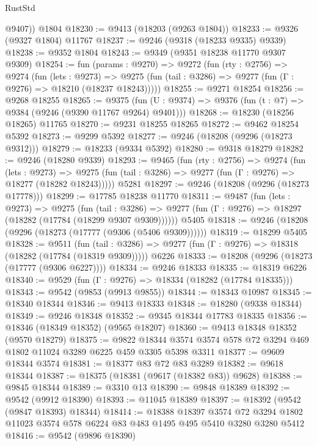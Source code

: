 \begin{lexlean}{RustStd}
\begin{coremodule}
{\begin{coremodule}
{{{{{{{{{{{{{{{{{{{{{{{{{{{{{{{{{        @9407))
    @1804
@18230 := @9413 (@18203 (@9263 @1804))
@18233 := @9326 (@9327 @1804) @11767
@18237 := @9246 (@9318 (@18233 @9335) @9339)
@18238 := @9352 @1804
@18243 := @9349 (@9351 @18238 @11770 @9307 @9309)
@18254 := fun (params : @9270) =>
  @9272
    (fun (rty : @2756) =>
    @9274
      (fun (lets : @9273) =>
      @9275 (fun (tail : @3286) => @9277 (fun (Γ : @9276) => @18210 (@18237 @18243)))))
@18255 := @9271 @18254
@18256 := @9268 @18255
@18265 := @9375
    (fun (U : @9374) => @9376 (fun (t : @7) => @9384 (@9246 (@9390 @11767 @9264) @9401)))
@18268 := @18230 (@18256 @18265) @11765
@18270 := @9231 @18255 @18265
@18272 := @9462 @18254 @5392
@18273 := @9299 @5392
@18277 := @9246 (@18208 (@9296 (@18273 @9312)))
@18279 := @18233 (@9334 @5392)
@18280 := @9318 @18279
@18282 := @9246 (@18280 @9339)
@18293 := @9465
    (fun (rty : @2756) =>
    @9274
      (fun (lets : @9273) =>
      @9275 (fun (tail : @3286) => @9277 (fun (Γ : @9276) => @18277 (@18282 @18243)))))
    @5281
@18297 := @9246 (@18208 (@9296 (@18273 @17778)))
@18299 := @17785 @18238 @11770
@18311 := @9487
    (fun (lets : @9273) =>
    @9275
      (fun (tail : @3286) =>
      @9277 (fun (Γ : @9276) => @18297 (@18282 (@17784 (@18299 @9307 @9309))))))
    @5405
@18318 := @9246 (@18208 (@9296 (@18273 (@17777 (@9306 (@5406 @9309))))))
@18319 := @18299 @5405
@18328 := @9511
    (fun (tail : @3286) => @9277 (fun (Γ : @9276) => @18318 (@18282 (@17784 (@18319 @9309)))))
    @6226
@18333 := @18208 (@9296 (@18273 (@17777 (@9306 @6227))))
@18334 := @9246 @18333
@18335 := @18319 @6226
@18340 := @9529 (fun (Γ : @9276) => @18334 (@18282 (@17784 @18335)))
@18343 := @9542 (@9853 (@9913 @9855))
@18344 := @18343 @10987
@18345 := @18340 @18344
@18346 := @9413 @18333
@18348 := @18280 (@9338 @18344)
@18349 := @9246 @18348
@18352 := @9345 @18344 @17783 @18335
@18356 := @18346 (@18349 @18352) (@9565 @18207)
@18360 := @9413 @18348 @18352 (@9570 @18279)
@18375 := @9822
    @18344
    @3574
    @3574
    @578
    @72
    @3294
    @469
    @1802
    @11024
    @3289
    @6225
    @459
    @3305
    @5398
    @3311
@18377 := @9609 @18344 @3574
@18381 := @18377 @83 @72 @83 @3289
@18382 := @9618 @18344
@18387 := @18375 (@18381 (@9617 (@18382 @83)) @9628)
@18388 := @9845 @18344
@18389 := @3310 @13
@18390 := @9848 @18389
@18392 := @9542 (@9912 @18390)
@18393 := @11045 @18389
@18397 := @18392 (@9542 (@9847 @18393) @18344)
@18414 := @18388
    @18397
    @3574
    @72
    @3294
    @1802
    @11023
    @3574
    @578
    @6224
    @83
    @483
    @1495
    @495
    @5410
    @3280
    @3280
    @5412
@18416 := @9542 (@9896 @18390)
}}}}}}}}}}}}}}}}}}}}}}}}}}}}}}}}}
\end{coremodule}}
\end{coremodule}
\end{lexlean}
